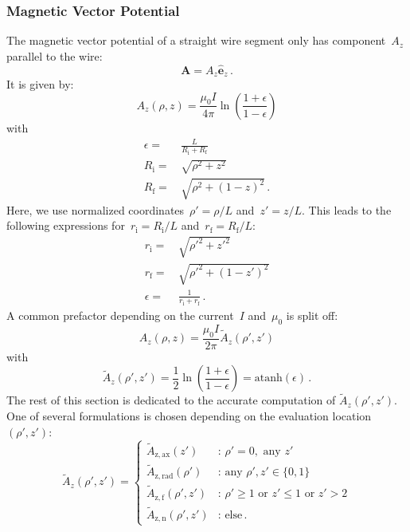 \subsubsection{Magnetic Vector Potential}
The magnetic vector potential of a straight wire segment
only has component~$A_z$ parallel to the wire:
\begin{equation}
 \mathbf{A} = A_z \hat{\mathbf{e}}_z \, .
\end{equation}
It is given by:
\begin{equation}
  A_z(\rho, z) = \frac{\mu_0 I}{4 \pi} \ln \left( \frac{1 + \epsilon}{1 - \epsilon} \right)
\end{equation}
with
\begin{align}
  \epsilon =&\, \frac{L}{R_\mathrm{i} + R_\mathrm{f}} \\
       R_\mathrm{i} =&\, \sqrt{\rho^2 + z^2} \\
       R_\mathrm{f} =&\, \sqrt{\rho^2 + (1 - z)^2} \, .
\end{align}
Here, we use normalized coordinates~$\rho' = \rho/L$ and~$z' = z/L$.
This leads to the following expressions
for~$r_\mathrm{i} = R_\mathrm{i}/L$ and~$r_\mathrm{f} = R_\mathrm{f}/L$:
\begin{align}
  r_\mathrm{i} =&\, \sqrt{{\rho'}^2 +      {z'}^2 }       \label{eqn:r_i_default} \\
  r_\mathrm{f} =&\, \sqrt{{\rho'}^2 + (1 - {z'})^2}       \label{eqn:r_f_default} \\
  \epsilon     =&\, \frac{1}{r_\mathrm{i} + r_\mathrm{f}} \label{eqn:eps_default}\, .
\end{align}
A common prefactor depending on the current~$I$ and~$\mu_0$ is split off:
\begin{equation}
  A_z(\rho, z) = \frac{\mu_0 I}{2 \pi} \tilde{A}_z (\rho', z')
\end{equation}
with
\begin{equation}
  \tilde{A}_z (\rho', z')
  = \frac{1}{2} \ln \left( \frac{1 + \epsilon}{1 - \epsilon} \right)
  = \textrm{atanh} (\epsilon) \, . \label{eqn:A_z_tilde}
\end{equation}
The rest of this section is dedicated to the accurate computation of $\tilde{A}_z (\rho', z')$.
One of several formulations is chosen depending on the evaluation location~$(\rho', z')$:
\begin{equation}
  \tilde{A}_z (\rho', z') =
  \begin{cases}
    \tilde{A}_\mathrm{z,ax}  (z')        &:\, \rho' = 0 , \textrm{ any } z'      \\
    \tilde{A}_\mathrm{z,rad} (\rho')     &:\, \textrm{any } \rho', z' \in \{0, 1\} \\
    \tilde{A}_\mathrm{z,f}   (\rho', z') &:\, \rho' \geq 1 \textrm{ or } z' \leq 1 \textrm{ or } z' > 2 \\
    \tilde{A}_\mathrm{z,n}   (\rho', z') &:\, \textrm{else} \, .
  \end{cases}
\end{equation}
